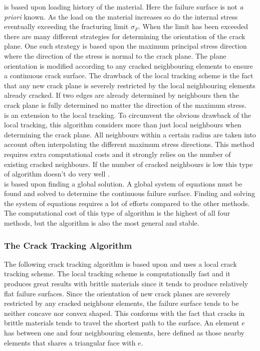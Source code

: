  is based upon loading history of the material.
Here the failure surface is not \textit{a priori} known. As the load on
the material increases so do the internal stress eventually
exceeding the fracturing limit $\sigma_F$. When the limit has been exceeded there
are many different strategies for determining the orientation of the
crack plane. One such strategy is based upon the maximum principal
stress direction where the direction of the stress is normal to the
crack plane. The plane orientation is modified according to
any cracked neighbouring elements to ensure a continuous crack
surface. The drawback of the local tracking scheme is the fact that
any new crack plane is severely restricted by the local neighbouring
elements already cracked. If two edges are already determined by
neighbours then the crack plane is fully determined no matter the direction
of the maximum stress.  \\


 is an extension to the local tracking. To
circumvent the obvious drawback of the local tracking, this algorithm
considers more than just local neighbours when determining the crack
plane. All neighbours within a certain radius are taken into account
often interpolating the different maximum stress directions. This
method requires extra computational costs and it strongly relies on
the number of existing cracked neighbours. If the number of cracked
neighbours is low this type of algorithm doesn't do very well
. \\


 is based upon finding a global solution. A
global system of equations must be found and solved to determine the continuous
failure surface. Finding and solving the system of equations requires
a lot of efforts compared to the other methods.
The computational cost of this type of algorithm is the
highest of all four methods, but the algorithm is also the most
general and stable. \\
 

\subsubsection{The Crack Tracking Algorithm}
\label{sec:crack_tracking_algorithm}
The following crack tracking algorithm is based upon
 and uses a local crack tracking scheme. 
The local tracking scheme is computationally fast and it produces great
results with brittle materials since it tends to produce relatively
flat failure surfaces. Since the orientation of new crack planes
are severely restricted by any cracked neighbour elements, the failure
surface tends to be neither concave nor convex shaped. This conforms
with the fact that cracks in brittle materials tends to travel
the shortest path to the surface.
An element $e$ has between one and four neighbouring elements, here
defined as those nearby elements that shares a triangular face with
$e$. \\

